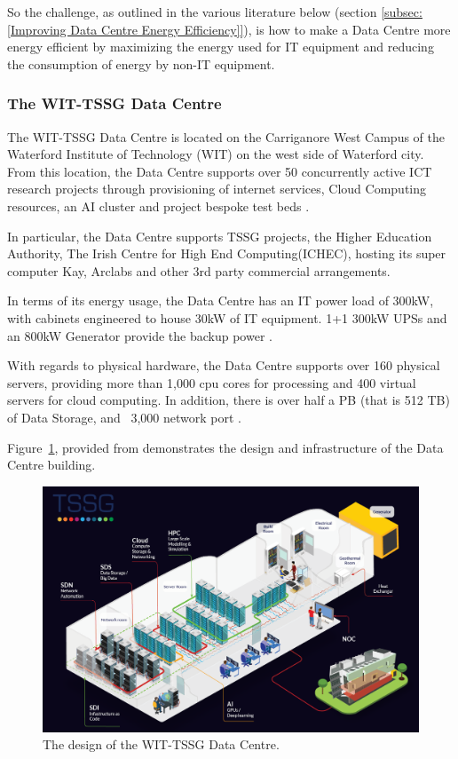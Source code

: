 \documentclass[12pt]{scrartcl}
\begin{document}
So the challenge, as outlined in the various literature below (section \ref{subsec:[Improving Data Centre Energy Efficiency]}), is how to make a Data Centre more energy efficient by maximizing the energy used for IT equipment and reducing the consumption of energy by non-IT equipment. 

\subsubsection{The WIT-TSSG Data Centre}
\label{subsubsec:[The WIT-TSSG Data Centre]}

The WIT-TSSG Data Centre is located on the Carriganore West Campus of the Waterford Institute of Technology (WIT) on the west side of Waterford city. From this location, the Data Centre supports over 50 concurrently active ICT research projects through provisioning of internet services, Cloud Computing resources, an AI cluster and project bespoke test beds \citep{TSSG}. 

In particular, the Data Centre supports TSSG projects, the Higher Education Authority, The Irish Centre for High End Computing(ICHEC), hosting its super computer Kay, Arclabs and other 3rd party commercial arrangements.

In terms of its energy usage, the Data Centre has an IT power load of 300kW, with cabinets engineered to house 30kW of IT equipment. 1+1 300kW UPSs and an 800kW Generator provide the backup power \citep{TSSG}.

With regards to physical hardware, the Data Centre supports over 160 physical servers, providing more than 1,000 cpu cores for processing and 400 virtual servers for cloud computing.  In addition, there is over half a PB (that is 512 TB) of Data Storage, and ~3,000 network port \citep{TSSG}. 

Figure~\ref{fig:TSSGdataCentreDesign}, provided from \citet{TSSG} demonstrates the design and infrastructure of the Data Centre building.  

\begin{figure}[h]
  \caption{The design of the WIT-TSSG Data Centre.}
  \label{fig:TSSGdataCentreDesign}
  \centering
    \includegraphics[scale=0.35]{TSSG_Diagram}
\end{figure}
\end{document}

